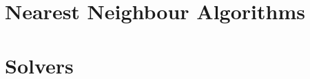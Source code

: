 \section{Nearest Neighbour Algorithms}
\label{nearestNeighbourAlgorithms}


\section{Solvers}
\label{solvers}

